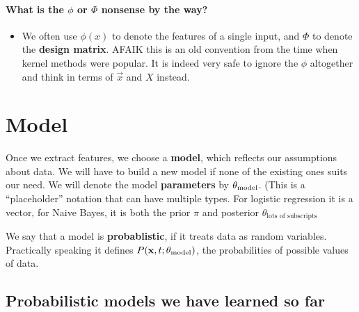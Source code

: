 \documentclass{discussion}
\providecommand{\tightlist}{%
\setlength{\itemsep}{2pt}\setlength{\parskip}{0pt}}
\begin{document}
\paragraph{What is the \(\phi\) or
\(\Phi\)
nonsense by the way?}

\begin{itemize}
\tightlist
\item  We often use $\phi(x)$ to denote the features of a single input, and
  $\Phi$ to denote the \textbf{design matrix}. AFAIK this is an old
  convention from the time when kernel methods were popular. It is
  indeed very safe to ignore the \(\phi\) altogether and think in terms
  of \(\vec{x}\) and \(X\) instead.
\end{itemize}

\section{Model}\label{model}
  Once we extract features, we choose a \textbf{model}, which reflects our
  assumptions about data. We will have to build a new model if none of the
    existing ones suits our need.  We will denote the model \textbf{parameters} by \(\mathbf{\theta}_{\text{model}}\). (This is a ``placeholder'' notation that can have multiple types. For logistic regression it is a  vector, for Naive Bayes, it is both the prior $\pi$ and posterior $\theta_{\text{lots of subscripts}}$ 

    We say that a model is \textbf{probablistic}, if it treats data as random
  variables. Practically speaking it defines $P(\mathbf{x}, t; \mathbf{\theta}_{\text{model}})$, the probabilities of possible values of data. 

\vspace{1em}

\subsection{Probabilistic models we have learned so
far}
\end{document}
